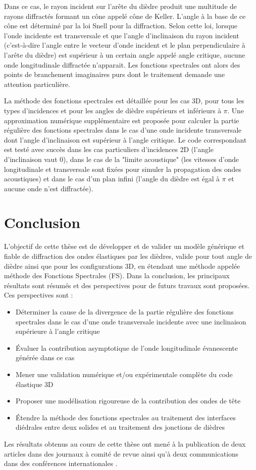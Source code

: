 Dans ce cas, le rayon incident sur l'arête du dièdre produit une multitude de rayons diffractés formant un cône appelé cône de Keller. L'angle à la base de ce cône est déterminé par la loi Snell pour la diffraction. Selon cette loi, lorsque l'onde incidente est transversale et que l'angle d'inclinaison du rayon incident (c'est-à-dire l'angle entre le vecteur d'onde incident et le plan perpendiculaire à l'arête du dièdre) est supérieur à un certain angle appelé angle critique, aucune onde longitudinale diffractée n'apparait. Les fonctions spectrales ont alors des points de branchement imaginaires purs dont le traitement demande une attention particulière. 

La méthode des fonctions spectrales est détaillée pour les cas 3D, pour tous les types d'incidences et pour les angles de dièdre supérieurs et inférieurs à $\pi$. Une approximation numérique supplémentaire est proposée pour calculer la partie régulière des fonctions spectrales dans le cas d'une onde incidente transversale dont l'angle d'inclinaison est supérieur à l'angle critique. Le code correspondant est testé avec succès dans les cas particuliers d'incidences 2D (l'angle d'inclinaison vaut $0$), dans le cas de la "limite acoustique" (les vitesses d'onde longitudinale et transversale sont fixées pour simuler la propagation des ondes acoustiques) et dans le cas d'un plan infini (l'angle du dièdre est égal à $\pi$ et aucune onde n'est diffractée).

\section[Conclusion]{Conclusion}

L'objectif de cette thèse est de développer et de valider un modèle générique et fiable de diffraction des ondes élastiques par les dièdres, valide pour tout angle de dièdre ainsi que pour les configurations 3D, en étendant une méthode appelée méthode des Fonctions Spectrales (FS). Dans la conclusion, les principaux résultats sont résumés et des perspectives pour de futurs travaux sont proposées. Ces perspectives sont :
\begin{itemize}
\item Déterminer la cause de la divergence de la partie régulière des fonctions spectrales dans le cas d'une onde transversale incidente avec une inclinaison supérieure à l'angle critique
\item Évaluer la contribution asymptotique de l'onde longitudinale évanescente générée dans ce cas
\item Mener une validation numérique et/ou expérimentale complète du code élastique 3D
\item Proposer une modélisation rigoureuse de la contribution des ondes de tête
\item Étendre la méthode des fonctions spectrales au traitement des interfaces diédrales entre deux solides et au traitement des jonctions de dièdres
\end{itemize}


Les résultats obtenus au cours de cette thèse ont mené à la publication de deux articles dans des journaux à comité de revue \cite{article, articleelasto} ainsi qu'à deux communications dans des conférences internationales \cite{DD2018,AFPAC}.
